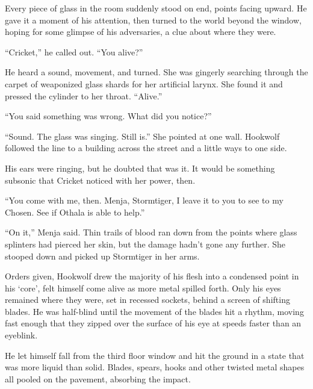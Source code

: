 Every piece of glass in the room suddenly stood on end, points facing upward.  He gave it a moment of his attention, then turned to the world beyond the window, hoping for some glimpse of his adversaries, a clue about where they were.



``Cricket,'' he called out.  ``You alive?''



He heard a sound, movement, and turned. She was gingerly searching through the carpet of weaponized glass shards for her artificial larynx.  She found it and pressed the cylinder to her throat.  ``Alive.''



``You said something was wrong.  What did you notice?''



``Sound.  The glass was singing.  Still is.''  She pointed at one wall.  Hookwolf followed the line to a building across the street and a little ways to one side.



His ears were ringing, but he doubted that was it.  It would be something subsonic that Cricket noticed with her power, then.



``You come with me, then.  Menja, Stormtiger, I leave it to you to see to my Chosen.  See if Othala is able to help.''



``On it,'' Menja said.  Thin trails of blood ran down from the points where glass splinters had pierced her skin, but the damage hadn't gone any further.  She stooped down and picked up Stormtiger in her arms.



Orders given, Hookwolf drew the majority of his flesh into a condensed point in his `core', felt himself come alive as more metal spilled forth.  Only his eyes remained where they were, set in recessed sockets, behind a screen of shifting blades.  He was half-blind until the movement of the blades hit a rhythm, moving fast enough that they zipped over the surface of his eye at speeds faster than an eyeblink.



He let himself fall from the third floor window and hit the ground in a state that was more liquid than solid.  Blades, spears, hooks and other twisted metal shapes all pooled on the pavement, absorbing the impact.



